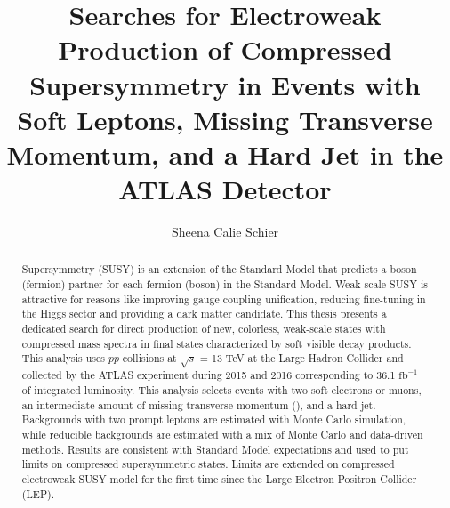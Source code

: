 \documentclass[11pt]{ucthesis}
\begin{document}

\title{Searches for Electroweak Production of Compressed Supersymmetry in Events with Soft Leptons, Missing Transverse Momentum, and a Hard Jet in the ATLAS Detector}
\author{Sheena Calie Schier}
\deanlinethree{}
\begin{frontmatter}

\maketitle
\copyrightpage

\tableofcontents
\listoffigures
\listoftables

\makeatletter
\newcommand{\rmnum}[1]{\romannumeral #1}
\newcommand{\Rmnum}[1]{\expandafter\@slowromancap\romannumeral #1@}
\makeatother

\begin{abstract}
Supersymmetry (SUSY) is an extension of the Standard Model that predicts a boson (fermion) partner for each fermion (boson) in the Standard Model. Weak-scale SUSY is attractive for reasons like improving gauge coupling unification, reducing fine-tuning in the Higgs sector and providing a dark matter candidate. This thesis presents a dedicated search for direct production of new, colorless, weak-scale states with compressed mass spectra in final states characterized by soft visible decay products. This analysis uses $pp$ collisions at $\sqrt s$ = 13 TeV at the Large Hadron Collider and collected by the ATLAS experiment during 2015 and 2016 corresponding to 36.1 $\mathrm{fb}^{-1}$ of integrated luminosity. This analysis selects events with two soft electrons or muons, an intermediate amount of missing transverse momentum (\met{}), and a hard jet. Backgrounds with two prompt leptons are estimated with Monte Carlo simulation, while reducible backgrounds are estimated with a mix of Monte Carlo and data-driven methods. Results are consistent with Standard Model expectations and used to put limits on compressed supersymmetric states.  Limits are extended on compressed electroweak SUSY model for the first time since the Large Electron Positron Collider (LEP).


\end{abstract}
\end{frontmatter}
\end{document}
